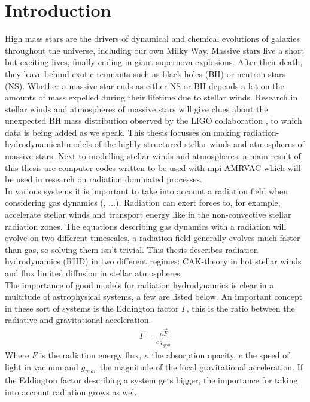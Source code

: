 \chapter{Introduction}
High mass stars are the drivers of dynamical and chemical evolutions of galaxies throughout the universe, including our own Milky Way. Massive stars live a short but exciting lives, finally ending in giant supernova explosions. After their death, they leave behind exotic remnants such as black holes (BH) or neutron stars (NS). Whether a massive star ends as either NS or BH depends a lot on the amounts of mass expelled during their lifetime due to stellar winds. Research in stellar winds and atmospheres of massive stars will give clues about the unexpected BH mass distribution observed by the LIGO collaboration \cite{Abbott1}, to which data is being added as we speak. This thesis focusses on making radiation-hydrodynamical models of the highly structured stellar winds and atmospheres of massive stars. Next to modelling stellar winds and atmospheres, a main result of this thesis are computer codes written to be used with mpi-AMRVAC which will be used in research on radiation dominated processes.\\

In various systems it is important to take into account a radiation field when considering gas dynamics (\cite{Tetsu2016},  ...). Radiation can exert forces to, for example, accelerate stellar winds and transport energy like in the non-convective stellar radiation zones. The equations describing gas dynamics with a radiation will evolve on two different timescales, a radiation field generally evolves much faster than gas, so solving them isn't trivial. This thesis describes radiation hydrodynamics (RHD) in two different regimes: CAK-theory in hot stellar winds and flux limited diffusion in stellar atmospheres.\\

The importance of good models for radiation hydrodynamics is clear in a multitude of astrophysical systems, a few are listed below. An important concept in these sort of systems is the Eddington factor $\Gamma$, this is the ratio between the radiative and gravitational acceleration.
\begin{align}
	\Gamma = \frac{\kappa \vec{F}}{c \vec{g}_{grav}}
\end{align}
Where $F$ is the radiation energy flux, $\kappa$ the absorption opacity, $c$ the speed of light in vacuum and $g_{grav}$ the magnitude of the local gravitational acceleration. If the Eddington factor describing a system gets bigger, the importance for taking into account radiation grows as wel.

